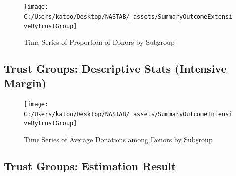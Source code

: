 \documentclass[ review  , 3p ]{elsarticle}
\begin{document}
  \begin{figure}

  {\centering \texttt{[image: C:/Users/katoo/Desktop/NASTAB/\_assets/SummaryOutcomeExtensiveByTrustGroup]} 

  }

  \caption{Time Series of Proportion of Donors by Subgroup}\label{fig:unnamed-chunk-8}
  \end{figure}

  \hypertarget{trust-groups-descriptive-stats-intensive-margin}{%
  \subsection{Trust Groups: Descriptive Stats (Intensive Margin)}\label{trust-groups-descriptive-stats-intensive-margin}}

  \begin{figure}

  {\centering \texttt{[image: C:/Users/katoo/Desktop/NASTAB/\_assets/SummaryOutcomeIntensiveByTrustGroup]} 

  }

  \caption{Time Series of Average Donations among Donors by Subgroup}\label{fig:unnamed-chunk-9}
  \end{figure}

  \hypertarget{trust-groups-estimation-result}{%
  \subsection{Trust Groups: Estimation Result}\label{trust-groups-estimation-result}}
\end{document}
